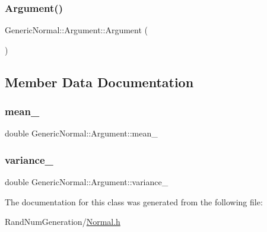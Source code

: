 \subsubsection{\texorpdfstring{Argument()}{Argument()}}
{\footnotesize\ttfamily Generic\+Normal\+::\+Argument\+::\+Argument (\begin{DoxyParamCaption}{ }\end{DoxyParamCaption})\hspace{0.3cm}{\ttfamily [inline]}}



\subsection{Member Data Documentation}
\hypertarget{class_generic_normal_1_1_argument_a2831c73fc24cfc71afc7045b47ef5d49}{}\label{class_generic_normal_1_1_argument_a2831c73fc24cfc71afc7045b47ef5d49} 
\subsubsection{\texorpdfstring{mean\+\_\+}{mean\_}}
{\footnotesize\ttfamily double Generic\+Normal\+::\+Argument\+::mean\+\_\+}

\hypertarget{class_generic_normal_1_1_argument_a95dbb3649aa02c89f3614ce0836e0596}{}\label{class_generic_normal_1_1_argument_a95dbb3649aa02c89f3614ce0836e0596} 
\subsubsection{\texorpdfstring{variance\+\_\+}{variance\_}}
{\footnotesize\ttfamily double Generic\+Normal\+::\+Argument\+::variance\+\_\+}



The documentation for this class was generated from the following file\+:\begin{DoxyCompactItemize}
\item 
Rand\+Num\+Generation/\hyperlink{_normal_8h}{Normal.\+h}\end{DoxyCompactItemize}
